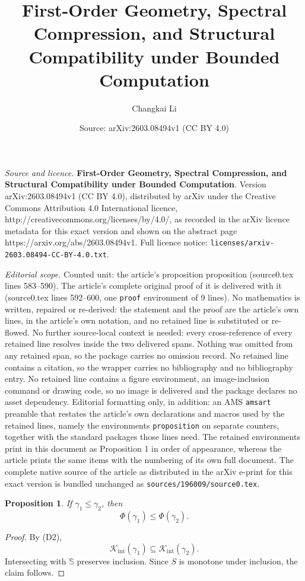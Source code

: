 \documentclass[10pt,a4paper]{amsart}
\title{\textbf{First-Order Geometry, Spectral Compression, and Structural Compatibility under Bounded Computation}}
\author{Changkai Li}
\date{Source: arXiv:2603.08494v1 (CC BY 4.0)}
\newtheorem{proposition}{Proposition}
\begin{document}
\maketitle

\noindent\emph{Source and licence.} \textbf{First-Order Geometry, Spectral Compression, and Structural Compatibility under Bounded Computation}. Version arXiv:2603.08494v1 (CC BY 4.0), distributed by arXiv under the Creative Commons Attribution 4.0 International licence, http://creativecommons.org/licenses/by/4.0/, as recorded in the arXiv licence metadata for this exact version and shown on the abstract page https://arxiv.org/abs/2603.08494v1. Full licence notice: \texttt{licenses/arxiv-2603.08494-CC-BY-4.0.txt}.\par\smallskip

\noindent\textit{Editorial scope.} Counted unit: the article's proposition proposition (source0.tex lines 583--590). The article's complete original proof of it is delivered with it (source0.tex lines 592--600, one \texttt{proof} environment of 9 lines). No mathematics is written, repaired or re-derived: the statement and the proof are the article's own lines, in the article's own notation, and no retained line is substituted or re-flowed.  No further source-local context is needed: every cross-reference of every retained line resolves inside the two delivered spans.  Nothing was omitted from any retained span, so the package carries no omission record.  No retained line contains a citation, so the wrapper carries no bibliography and no bibliography entry.  No retained line contains a figure environment, an image-inclusion command or drawing code, so no image is delivered and the package declares no asset dependency.  Editorial formatting only, in addition: an AMS \texttt{amsart} preamble that restates the article's own declarations and macros used by the retained lines, namely the environments \texttt{proposition} on separate counters, together with the standard packages those lines need.  The retained environments print in this document as Proposition 1 in order of appearance, whereas the article prints the same items with the numbering of its own full document.  The complete native source of the article as distributed in the arXiv e-print for this exact version is bundled unchanged as \texttt{sources/196009/source0.tex}.
\begin{proposition}
 If $\gamma_1 \le \gamma_2$, then
 \[
 \Phi(\gamma_1)
 \le
 \Phi(\gamma_2).
 \]
\end{proposition}

\begin{proof}
 By (D2),
 \[
 \mathcal{K}_{\mathrm{int}}(\gamma_1)
 \subseteq
 \mathcal{K}_{\mathrm{int}}(\gamma_2).
 \]
 Intersecting with $\mathbb{S}$ preserves inclusion. Since $S$ is monotone under inclusion, the claim follows.
\end{proof}
\end{document}
